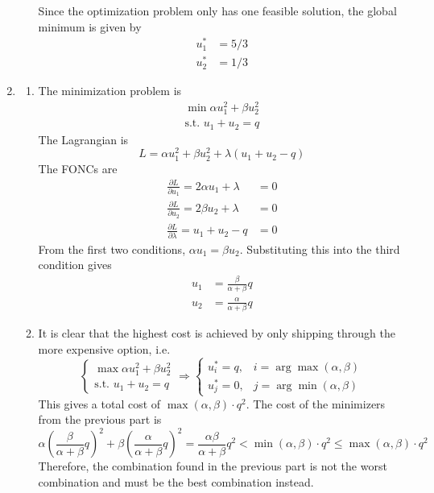 \documentclass[letterpaper,12pt,titlepage]{article}
\newcommand*\pder[2]{\frac{\partial #1}{\partial #2}}
\begin{document}
\begin{enumerate}[leftmargin=0pt]
\begin{enumerate}
    Since the optimization problem only has one feasible solution, the global minimum is given by
    \begin{align}
      u^*_1 &= 5/3 \\
      u^*_2 &= 1/3
    \end{align}
  \end{enumerate}

\item \begin{enumerate}
  \item The minimization problem is
    \begin{gather}
      \min \alpha u_1^2 + \beta u_2^2 \\
      \text{s.t. } u_1 + u_2 = q
    \end{gather}
    The Lagrangian is
    \[ L = \alpha u_1^2 + \beta u_2^2 + \lambda(u_1+u_2-q) \]
    The FONCs are
    \begin{align}
      \pder{L}{u_1} = 2\alpha u_1 + \lambda &= 0 \\
      \pder{L}{u_2} = 2\beta u_2 + \lambda &= 0 \\
      \pder{L}{\lambda} = u_1+u_2-q &= 0
    \end{align}
    From the first two conditions, $\alpha u_1 = \beta u_2$. Substituting this into the third condition gives
    \begin{align}
      u_1 &= \frac{\beta}{\alpha+\beta} q \\
      u_2 &= \frac{\alpha}{\alpha+\beta} q
    \end{align}
  \item It is clear that the highest cost is achieved by only shipping through the more expensive option, i.e.
    \[
      \begin{cases}
        \max \alpha u_1^2 + \beta u_2^2 \\
        \text{s.t. } u_1 + u_2 = q
      \end{cases}
      \Longrightarrow
      \begin{cases}
        u^*_i = q, & i = \arg\max(\alpha,\beta) \\
        u^*_j = 0, & j = \arg\min(\alpha,\beta)
      \end{cases}
    \]
    This gives a total cost of $\max(\alpha,\beta)\cdot q^2$. The cost of the minimizers from the previous part is
    \[ \alpha \left(\frac{\beta}{\alpha+\beta} q\right)^2 + \beta \left(\frac{\alpha}{\alpha+\beta} q\right)^2 = \frac{\alpha\beta}{\alpha+\beta} q^2 < \min(\alpha,\beta)\cdot q^2 \le \max(\alpha,\beta)\cdot q^2 \]
    Therefore, the combination found in the previous part is not the worst combination and must be the best combination instead.
  \end{enumerate}


\end{enumerate}
\end{document}
